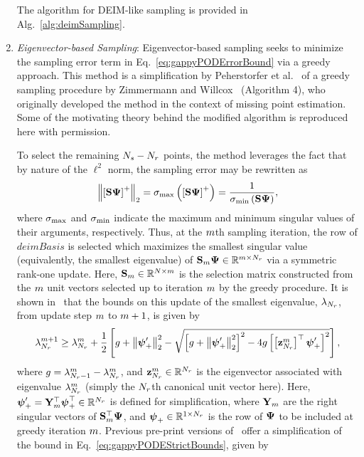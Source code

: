\begin{enumerate}
	The algorithm for DEIM-like sampling is provided in Alg.~\ref{alg:deimSampling}.

	\item \textit{Eigenvector-based Sampling}: Eigenvector-based sampling seeks to minimize the sampling error term in Eq.~\ref{eq:gappyPODErrorBound} via a greedy approach. This method is a simplification by Peherstorfer et al.~\cite{Peherstorfer2020} of a greedy sampling procedure by Zimmermann and Willcox~\cite{Zimmermann2016} (Algorithm 4), who originally developed the method in the context of missing point estimation. Some of the motivating theory behind the modified algorithm is reproduced here with permission.

	To select the remaining $N_s - N_r$ points, the method leverages the fact that by nature of the $\ell^2$ norm, the sampling error may be rewritten as
	\begin{equation}
		\left\Vert \left[ \sampMat \deimBasis \right]^+ \right\Vert_2 = \singVal_{\text{max}} \left( \left[\sampMat \deimBasis \right]^+ \right) = \frac{1}{\singVal_{\text{min}} \left( \sampMat \deimBasis \right)},
	\end{equation}
	where $\sigma_{\text{max}}$ and $\sigma_{\text{min}}$ indicate the maximum and minimum singular values of their arguments, respectively. Thus, at the $m$th sampling iteration, the row of $deimBasis$ is selected which maximizes the smallest singular value (equivalently, the smallest eigenvalue) of $\sampMat_{\greedyIdx} \deimBasis \inRTwo{\greedyIdx}{\numResModes}$ via a symmetric rank-one update. Here, $\mathbf{S}_{m} \in \mathbb{R}^{N \times m}$ is the selection matrix constructed from the $m$ unit vectors selected up to iteration $m$ by the greedy procedure. It is shown in~\cite{Peherstorfer2020} that the bounds on this update of the smallest eigenvalue, $\lambda_{N_r}$, from update step $m$ to $m+1$, is given by
	\begin{equation}\label{eq:gappyPODEStrictBounds}
		\lambda_{N_r}^{m+1} \ge \lambda_{N_r}^{m} + \frac{1}{2} \left[ g + \left\Vert \boldsymbol{\psi}'_+ \right\Vert_2^2 - \sqrt{\left[ g + \left\Vert \boldsymbol{\psi}'_+ \right\Vert_2^2 \right]^2 - 4g\left[ \left[\mathbf{z}_{N_r}^{m} \right]^\top \boldsymbol{\psi}'_+ \right]^2} \right],
	\end{equation}
	where $g = \lambda_{N_r-1}^{m} - \lambda_{N_r}^{m}$, and $\mathbf{z}_{N_r}^{m} \in \mathbb{R}^{N_r}$ is the eigenvector associated with eigenvalue $\lambda_{N_r}^{m}$ (simply the $N_r$th canonical unit vector here). Here, $\deimBasisREvecRow = \rightEvecMat_{\greedyIdx}^\top \deimBasisRowUpdate^\top \inROne{\numResModes}$ is defined for simplification, where $\rightEvecMat_{\greedyIdx}$ are the right singular vectors of $\sampMat_{\greedyIdx}^\top \deimBasis$, and $\boldsymbol{\psi}_+ \in \mathbb{R}^{1 \times N_r}$ is the row of $\deimBasis$ to be included at greedy iteration $m$. Previous pre-print versions of~\cite{Peherstorfer2020} offer a simplification of the bound in Eq.~\ref{eq:gappyPODEStrictBounds}, given by

\end{enumerate}
